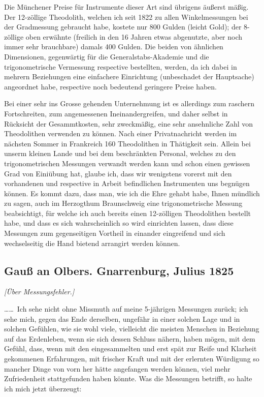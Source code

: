 \documentclass[12pt,a4paper]{article}
\theoremstyle{plain}
\theoremstyle{definition}
\theoremstyle{remark}
\begin{document}
Die M\"unchener Preise f\"ur Instrumente dieser Art sind \"ubrigens \"au\ss erst m\"a\ss ig. Der 12-z\"ollige Theodolith, welchen ich seit 1822 zu allen Winkelmessungen bei der Gradmessung gebraucht habe, kostete nur 800 Gulden (leicht Gold); der 8-z\"ollige oben erw\"ahnte (freilich in den 16 Jahren etwas abgenutzte, aber noch immer sehr brauchbare) damals 400 Gulden. Die beiden von \"ahnlichen Dimensionen, gegenw\"artig f\"ur die Generalstabs-Akademie und die trigonometrische Vermessung respective bestellten, werden, da ich dabei in mehrern Beziehungen eine einfachere Einrichtung (unbeschadet der Hauptsache) angeordnet habe, respective noch bedeutend geringere Preise haben.

Bei einer sehr ins Grosse gehenden Unternehmung ist es allerdings zum raschern Fortschreiten, zum angemessenen Ineinandergreifen, und daher selbst in R\"ucksicht der Gesammtkosten, sehr zweckm\"a\ss ig, eine sehr ansehnliche Zahl von Theodolithen verwenden zu k\"onnen. Nach einer Privatnachricht werden im n\"achsten Sommer in Frankreich 160 Theodolithen in Th\"atigkeit sein. Allein bei unserm kleinen Lande und bei dem beschr\"ankten Personal, welches zu den trigonometrischen Messungen verwandt werden kann und schon einen gewissen Grad von Eini\"ubung hat, glaube ich, dass wir wenigstens vorerst mit den vorhandenen und respective in Arbeit befindlichen Instrumenten uns begn\"ugen k\"onnen. Es kommt dazu, dass man, wie ich die Ehre gehabt habe, Ihnen m\"undlich zu sagen, auch im Herzogthum Braunschweig eine trigonometrische Messung beabsichtigt, f\"ur welche ich auch bereits einen 12-z\"olligen Theodolithen bestellt habe, und dass es sich wahrscheinlich so wird einrichten lassen, dass diese Messungen zum gegenseitigen Vortheil in einander eingreifend und sich wechselseitig die Hand bietend arrangirt werden k\"onnen.

\vfill
\eject

\subsection*{Gau\ss{} an Olbers. Gnarrenburg, Julius 1825}

\noindent
\textit{[\"Uber Messungsfehler.]}

\medskip

\ldots\ldots\ Ich sehe nicht ohne Missmuth auf meine 5-j\"ahrigen Messungen zur\"uck; ich sehe mich, gegen das Ende derselben, ungef\"ahr in einer solchen Lage und in solchen Gef\"uhlen, wie sie wohl viele, vielleicht die meisten Menschen in Beziehung auf das Erdenleben, wenn sie sich dessen Schluss n\"ahern, haben m\"ogen, mit dem Gef\"uhl, dass, wenn mit den eingesammelten und erst sp\"at zur Reife und Klarheit gekommenen Erfahrungen, mit frischer Kraft und mit der erlernten W\"urdigung so mancher Dinge von vorn her h\"atte angefangen werden k\"onnen, viel mehr Zufriedenheit stattgefunden haben k\"onnte. Was die Messungen betrifft, so halte ich mich jetzt \"uberzeugt:
\end{document}
